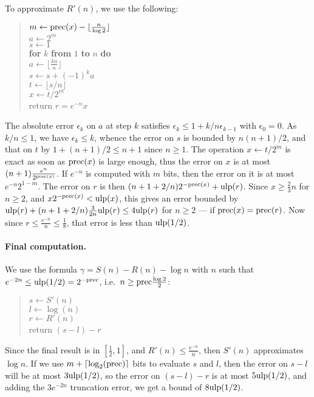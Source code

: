 \documentclass[12pt]{amsart}
\def\q{\hspace*{5mm}}
\def\ulp{{\rm ulp}}
\begin{document}
To approximate $R'(n)$, we use the following:
\begin{quote}
$m \leftarrow {\rm prec}(x) - \lfloor \frac{n}{\log 2} \rfloor$ \\
$a \leftarrow 2^m$ \\
$s \leftarrow 1$ \\
{\bf for} $k$ {\bf from} $1$ {\bf to} $n$ {\bf do} \\
\q $a \leftarrow \lfloor \frac{k a}{n} \rfloor$ \\
\q $s \leftarrow s + (-1)^{k} a$ \\
$t \leftarrow \lfloor s/n \rfloor$ \\
$x \leftarrow t/2^m$ \\
return $r = e^{-n} x$
\end{quote}
The absolute error $\epsilon_k$ on $a$ at step $k$ satisfies
$\epsilon_k \le 1 + k/n \epsilon_{k-1}$ with $\epsilon_0=0$.
As $k/n \le 1$, we have $\epsilon_k \le k$, whence the error
on $s$ is bounded by $n(n+1)/2$, and that on $t$ by 
$1 + (n+1)/2 \le n+1$ since $n \ge 1$.
The operation $x \leftarrow t/2^m$ is exact as soon as ${\rm prec}(x)$ is large
enough, thus the error on $x$ is at most $(n+1) \frac{e^n}{2^{{\rm prec}(x)}}$.
If $e^{-n}$ is computed with $m$ bits, then
the error on it is at most $e^{-n} 2^{1-m}$.
The error on $r$ is then $(n + 1 + 2/n) 2^{-{\rm prec}(x)} +
\ulp(r)$.
Since $x \ge \frac{2}{3} n$ for $n \ge 2$, and $x 2^{-{\rm prec}(x)}
< \ulp(x)$, this gives an error bounded by 
$\ulp(r) + (n + 1 + 2/n) \frac{3}{2n} \ulp(r)
\le 4 \ulp(r)$ for $n \ge 2$ --- if ${\rm prec}(x) = {\rm prec}(r)$.
Now since $r \le \frac{e^{-n}}{n} \le \frac{1}{8}$, that error
is less than $\ulp(1/2)$.

\paragraph{Final computation.} We use the formula
$\gamma = S(n) - R(n) - \log n$ with $n$ such that $e^{-2n} \le 
\ulp(1/2) = 2^{-{\rm prec}}$, i.e.~$n \ge {\rm prec} \frac{\log 2}{2}$:
\begin{quote}
$s \leftarrow S'(n)$ \\
$l \leftarrow \log(n)$ \\
$r \leftarrow R'(n)$ \\
return $(s - l) - r$
\end{quote}
Since the final result is in $[\frac{1}{2}, 1]$, and $R'(n) \le 
\frac{e^{-n}}{n}$, then $S'(n)$ approximates $\log n$.
If we use $m + \lceil \log_2({\rm prec}) \rceil$ bits to evaluate $s$ and $l$,
then the error on $s-l$ will be at most $3 \ulp(1/2)$,
so the error on $(s - l) - r$ is at most $5 \ulp(1/2)$,
and adding the $3 e^{-2n}$ truncation error, we get a bound of
$8 \ulp(1/2)$.
\end{document}
